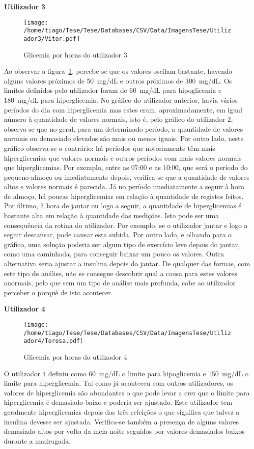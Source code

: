\textbf{Utilizador 3}

\begin{figure}[H]
\centering
\texttt{[image: /home/tiago/Tese/Tese/Databases/CSV/Data/ImagensTese/Utilizador3/Vitor.pdf]}
\caption{Glicemia por horas do utilizador 3}
\label{fig:uti3}
\end{figure}
Ao observar a figura~\ref{fig:uti3}, percebe-se que os valores oscilam bastante, havendo alguns valores próximos de 50~mg/dL e outros próximos de 300~mg/dL. Os limites definidos pelo utilizador foram de 60~mg/dL para hipoglicemia e 180~mg/dL para hiperglicemia. No gráfico do utilizador anterior, havia vários períodos do dia com hiperglicemia mas estes eram, aproximadamente, em igual número à quantidade de valores normais, isto é, pelo gráfico do utilizador 2, observa-se que no geral, para um determinado período, a quantidade de valores normais ou demasiado elevados são mais ou menos iguais. Por outro lado, neste gráfico observa-se o contrário: há períodos que notoriamente têm mais hiperglicemias que valores normais e outros períodos com mais valores normais que hiperglicemias. 
Por exemplo, entre as 07:00 e as 10:00, que será o período do pequeno-almoço ou imediatamente depois, verifica-se que a quantidade de valores altos e valores normais é parecida. Já no período imediatamente a seguir à hora de almoço, há poucas hiperglicemias em relação à quantidade de registos feitos. Por último, à hora de jantar ou logo a seguir, a quantidade de hiperglicemias é bastante alta em relação à quantidade das medições. Isto pode ser uma consequência da rotina do utilizador. Por exemplo, se o utilizador jantar e logo a seguir descansar, pode causar esta subida. Por outro lado, e olhando para o gráfico, uma solução poderia ser algum tipo de exercício leve depois do jantar, como uma caminhada, para conseguir baixar um pouco os valores. Outra alternativa seria ajustar a insulina depois do jantar. 
De qualquer das formas, com este tipo de análise, não se consegue descobrir qual a causa para estes valores anormais, pelo que sem um tipo de análise mais profunda, cabe ao utilizador perceber o porquê de isto acontecer.



\textbf{Utilizador 4}

\begin{figure}[H]
\centering
\texttt{[image: /home/tiago/Tese/Tese/Databases/CSV/Data/ImagensTese/Utilizador4/Teresa.pdf]}
\caption{Glicemia por horas do utilizador 4}
\label{fig:uti4}
\end{figure}
O utilizador 4 definiu como 60~mg/dL o limite para hipoglicemia e 150~mg/dL o limite para hiperglicemia. Tal como já aconteceu com outros utilizadores, os valores de hiperglicemia são abundantes o que pode levar a crer que o limite para hiperglicemia é demasiado baixo e poderia ser ajustado. Este utilizador tem geralmente hiperglicemias depois das três refeições o que significa que talvez a insulina devesse ser ajustada. Verifica-se também a presença de alguns valores demasiado altos por volta da meia noite seguidos por valores demasiados baixos durante a madrugada. 


